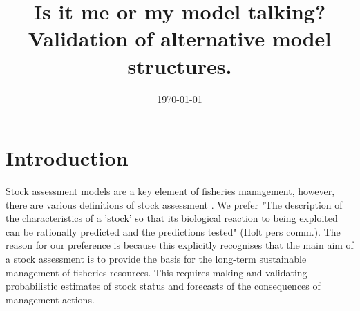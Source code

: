 \documentclass[12pt,halfline,a4paper,nonumbib]{ouparticle}
\begin{document}
\title{Is it me or my model talking? Validation of alternative model structures.}

\author{%
\address{ Centre for Environmental Policy, Imperial College London, Weeks Building, 16-18 Princes Gardens, London\\ SW7 1NE, UK}
\and
{}
\address{Institute or Organization, Department, City, State,\\
Zip Code, Country}
\and
{}
\address{Department of Marine Biosciences, Tokyo University of Marine Science and Technology, 4-5-7 Konan, Minato, Tokyo \\108-8477, Japan}
\and
{}
\address{Institute or Organization, Department, City, State,\\
Zip Code, Country}
\and
{}
\address{Institute or Organization, Department, City, State,\\
Zip Code, Country}
\and
{}
\address{Swedish University of Agricultural Sciences, Department of Aquatic Resources, Institute of Marine Research, Lysekil,\\ Sweden}
}

\abstract{
}

\date{\today}


\maketitle

\section{Introduction}

Stock assessment models are a key element of fisheries management, however, there are various definitions of stock assessment \parencite[e.g.][]{hilborn2003state,cadrin2014stock}. We prefer "The description of the characteristics of a 'stock' so that its biological reaction to being exploited can be rationally predicted and the predictions tested" (Holt pers comm.). The reason for our preference is because this explicitly recognises that the main aim of a stock assessment is to provide the basis for the long-term sustainable management of fisheries resources. This requires making and validating probabilistic estimates of stock status and forecasts of the consequences of management actions.
\end{document}
